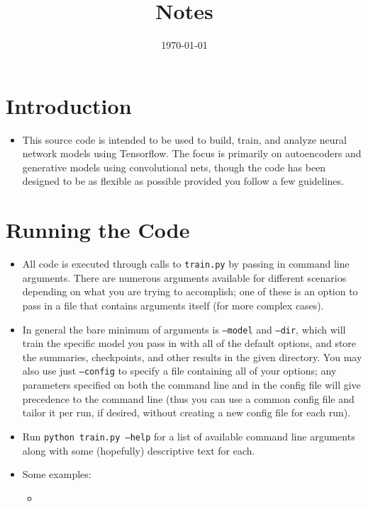 \documentclass{article}
\date{\today}
\title{Notes}
\begin{document}
\begin{flushleft}

  \section{Introduction}
  \begin{itemize}
  \item This source code is intended to be used to build, train, and analyze neural network models using Tensorflow. The focus is primarily on autoencoders and generative models using convolutional nets, though the code has been designed to be as flexible as possible provided you follow a few guidelines.
  \end{itemize}

  
  \section{Running the Code}
  \begin{itemize}
  \item All code is executed through calls to \texttt{train.py} by passing in command line arguments. There are numerous arguments available for different scenarios depending on what you are trying to accomplish; one of these is an option to pass in a file that contains arguments itself (for more complex cases). 
  \item In general the bare minimum of arguments is \texttt{--model} and \texttt{--dir}, which will train the specific model you pass in with all of the default options, and store the summaries, checkpoints, and other results in the given directory. You may also use just \texttt{--config} to specify a file containing all of your options; any parameters specified on both the command line and in the config file will give precedence to the command line (thus you can use a common config file and tailor it per run, if desired, without creating a new config file for each run).
  \item Run \texttt{python train.py --help} for a list of available command line arguments along with some (hopefully) descriptive text for each. 
  \item Some examples:
    \begin{itemize}
    \item
    \end{itemize}
  \end{itemize}
  



\end{flushleft}
\end{document}
